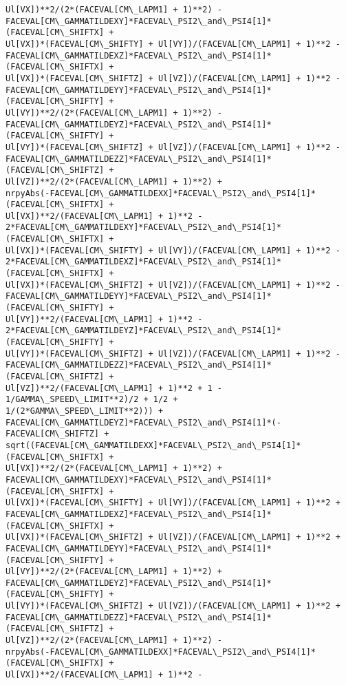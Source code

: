 \documentclass[landscape,letterpaper,10pt,english]{article}
\begin{document}
\begin{Verbatim}[commandchars=\\\{\}]
Ul[VX])**2/(2*(FACEVAL[CM\_LAPM1] + 1)**2) -
FACEVAL[CM\_GAMMATILDEXY]*FACEVAL\_PSI2\_and\_PSI4[1]*(FACEVAL[CM\_SHIFTX] +
Ul[VX])*(FACEVAL[CM\_SHIFTY] + Ul[VY])/(FACEVAL[CM\_LAPM1] + 1)**2 -
FACEVAL[CM\_GAMMATILDEXZ]*FACEVAL\_PSI2\_and\_PSI4[1]*(FACEVAL[CM\_SHIFTX] +
Ul[VX])*(FACEVAL[CM\_SHIFTZ] + Ul[VZ])/(FACEVAL[CM\_LAPM1] + 1)**2 -
FACEVAL[CM\_GAMMATILDEYY]*FACEVAL\_PSI2\_and\_PSI4[1]*(FACEVAL[CM\_SHIFTY] +
Ul[VY])**2/(2*(FACEVAL[CM\_LAPM1] + 1)**2) -
FACEVAL[CM\_GAMMATILDEYZ]*FACEVAL\_PSI2\_and\_PSI4[1]*(FACEVAL[CM\_SHIFTY] +
Ul[VY])*(FACEVAL[CM\_SHIFTZ] + Ul[VZ])/(FACEVAL[CM\_LAPM1] + 1)**2 -
FACEVAL[CM\_GAMMATILDEZZ]*FACEVAL\_PSI2\_and\_PSI4[1]*(FACEVAL[CM\_SHIFTZ] +
Ul[VZ])**2/(2*(FACEVAL[CM\_LAPM1] + 1)**2) +
nrpyAbs(-FACEVAL[CM\_GAMMATILDEXX]*FACEVAL\_PSI2\_and\_PSI4[1]*(FACEVAL[CM\_SHIFTX] +
Ul[VX])**2/(FACEVAL[CM\_LAPM1] + 1)**2 -
2*FACEVAL[CM\_GAMMATILDEXY]*FACEVAL\_PSI2\_and\_PSI4[1]*(FACEVAL[CM\_SHIFTX] +
Ul[VX])*(FACEVAL[CM\_SHIFTY] + Ul[VY])/(FACEVAL[CM\_LAPM1] + 1)**2 -
2*FACEVAL[CM\_GAMMATILDEXZ]*FACEVAL\_PSI2\_and\_PSI4[1]*(FACEVAL[CM\_SHIFTX] +
Ul[VX])*(FACEVAL[CM\_SHIFTZ] + Ul[VZ])/(FACEVAL[CM\_LAPM1] + 1)**2 -
FACEVAL[CM\_GAMMATILDEYY]*FACEVAL\_PSI2\_and\_PSI4[1]*(FACEVAL[CM\_SHIFTY] +
Ul[VY])**2/(FACEVAL[CM\_LAPM1] + 1)**2 -
2*FACEVAL[CM\_GAMMATILDEYZ]*FACEVAL\_PSI2\_and\_PSI4[1]*(FACEVAL[CM\_SHIFTY] +
Ul[VY])*(FACEVAL[CM\_SHIFTZ] + Ul[VZ])/(FACEVAL[CM\_LAPM1] + 1)**2 -
FACEVAL[CM\_GAMMATILDEZZ]*FACEVAL\_PSI2\_and\_PSI4[1]*(FACEVAL[CM\_SHIFTZ] +
Ul[VZ])**2/(FACEVAL[CM\_LAPM1] + 1)**2 + 1 - 1/GAMMA\_SPEED\_LIMIT**2)/2 + 1/2 +
1/(2*GAMMA\_SPEED\_LIMIT**2))) +
FACEVAL[CM\_GAMMATILDEYZ]*FACEVAL\_PSI2\_and\_PSI4[1]*(-FACEVAL[CM\_SHIFTZ] +
sqrt((FACEVAL[CM\_GAMMATILDEXX]*FACEVAL\_PSI2\_and\_PSI4[1]*(FACEVAL[CM\_SHIFTX] +
Ul[VX])**2/(2*(FACEVAL[CM\_LAPM1] + 1)**2) +
FACEVAL[CM\_GAMMATILDEXY]*FACEVAL\_PSI2\_and\_PSI4[1]*(FACEVAL[CM\_SHIFTX] +
Ul[VX])*(FACEVAL[CM\_SHIFTY] + Ul[VY])/(FACEVAL[CM\_LAPM1] + 1)**2 +
FACEVAL[CM\_GAMMATILDEXZ]*FACEVAL\_PSI2\_and\_PSI4[1]*(FACEVAL[CM\_SHIFTX] +
Ul[VX])*(FACEVAL[CM\_SHIFTZ] + Ul[VZ])/(FACEVAL[CM\_LAPM1] + 1)**2 +
FACEVAL[CM\_GAMMATILDEYY]*FACEVAL\_PSI2\_and\_PSI4[1]*(FACEVAL[CM\_SHIFTY] +
Ul[VY])**2/(2*(FACEVAL[CM\_LAPM1] + 1)**2) +
FACEVAL[CM\_GAMMATILDEYZ]*FACEVAL\_PSI2\_and\_PSI4[1]*(FACEVAL[CM\_SHIFTY] +
Ul[VY])*(FACEVAL[CM\_SHIFTZ] + Ul[VZ])/(FACEVAL[CM\_LAPM1] + 1)**2 +
FACEVAL[CM\_GAMMATILDEZZ]*FACEVAL\_PSI2\_and\_PSI4[1]*(FACEVAL[CM\_SHIFTZ] +
Ul[VZ])**2/(2*(FACEVAL[CM\_LAPM1] + 1)**2) -
nrpyAbs(-FACEVAL[CM\_GAMMATILDEXX]*FACEVAL\_PSI2\_and\_PSI4[1]*(FACEVAL[CM\_SHIFTX] +
Ul[VX])**2/(FACEVAL[CM\_LAPM1] + 1)**2 -

\end{Verbatim}
\end{document}
